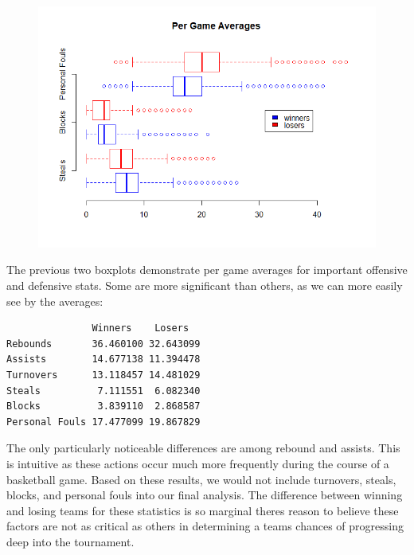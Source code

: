 \documentclass[]{scrartcl}
\begin{document}
\begin{figure}[H]
	\centering
	\includegraphics[scale=.6]{GameAverages2.png}
\end{figure}
The previous two boxplots demonstrate per game averages for important offensive and defensive stats. Some are more significant than others, as we can more easily see by the averages:
\begin{verbatim}
               Winners    Losers
Rebounds       36.460100 32.643099
Assists        14.677138 11.394478
Turnovers      13.118457 14.481029
Steals          7.111551  6.082340
Blocks          3.839110  2.868587
Personal Fouls 17.477099 19.867829
\end{verbatim}
The only particularly noticeable differences are among rebound and assists. This is intuitive as these actions occur much more frequently during the course of a basketball game. Based on these results, we would not include turnovers, steals, blocks, and personal fouls into our final analysis. The difference between winning and losing teams for these statistics is so marginal theres reason to believe these factors are not as critical as others in determining a teams chances of progressing deep into the tournament.
\end{document}
